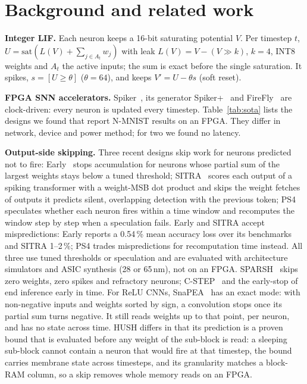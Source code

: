 \documentclass[conference]{IEEEtran}
\begin{document}
\section{Background and related work}\label{sec:bg}
\textbf{Integer LIF.} Each neuron keeps a 16-bit saturating potential $V$. Per timestep $t$,
$U = \mathrm{sat}(L(V) + \sum_{j\in A_t} w_{j})$ with leak $L(V)=V-(V\gg k)$, $k=4$, INT8 weights and $A_t$ the
active inputs; the sum is exact before the single saturation. It spikes, $s=[U\ge\theta]$ ($\theta=64$), and keeps
$V' = U-\theta s$ (soft reset).

\textbf{FPGA SNN accelerators.} Spiker~\cite{spiker}, its generator Spiker+~\cite{spikerplus} and
FireFly~\cite{firefly} are clock-driven: every neuron is updated every timestep. Table~\ref{tab:sota} lists the designs we found that report N-MNIST
results on an FPGA. They differ in network, device and power method; for two we found no latency.

\textbf{Output-side skipping.} Three recent designs skip work for neurons predicted not to fire:
Early~\cite{early} stops accumulation for neurons whose partial sum of the largest weights stays below a tuned
threshold; SITRA~\cite{sitra} scores each output of a spiking transformer with a weight-MSB dot product and skips the
weight fetches of outputs it predicts silent, overlapping detection with the previous token; PS4~\cite{ps4}
speculates whether each neuron fires within a time window and recomputes the window step by step when a speculation
fails. Early and SITRA accept mispredictions: Early reports a 0.54\,\% mean accuracy loss over its benchmarks and
SITRA 1--2\,\%; PS4 trades mispredictions for recomputation time instead. All three use tuned thresholds or
speculation and are evaluated with architecture simulators and ASIC synthesis (28 or 65\,nm), not on an FPGA. SPARSH~\cite{sparsh}
skips zero weights, zero spikes and refractory neurons; C-STEP~\cite{cstep} and the early-stop of~\cite{cheng2025}
end inference early in time. For ReLU CNNs, SnaPEA~\cite{snapea} has an exact mode: with non-negative inputs and
weights sorted by sign, a convolution stops once its partial sum turns negative. It still reads weights up to that
point, per neuron, and has no state across time. HUSH differs in that its prediction is a proven bound that is
evaluated before any weight of the sub-block is read: a sleeping sub-block cannot
contain a neuron that would fire at that timestep, the bound carries membrane state across timesteps, and its
granularity matches a block-RAM column, so a skip removes whole memory reads on an FPGA.
\end{document}
